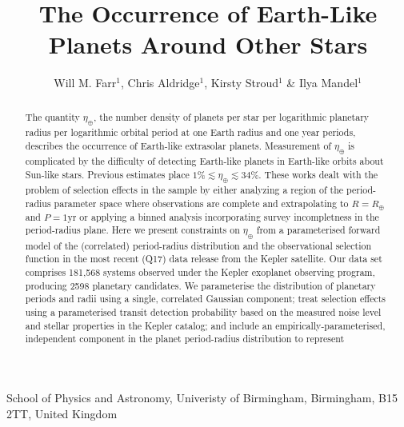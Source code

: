 \documentclass{nature}
\newcommand{\etaearth}{\eta_\oplus}
\newcommand{\REarth}{R_\oplus}
\begin{document}
\title{The Occurrence of Earth-Like Planets Around Other Stars}

\author{Will M. Farr$^{1}$, Chris Aldridge$^{1}$, Kirsty Stroud$^{1}$ \& Ilya Mandel$^{1}$}

\maketitle

\begin{affiliations}
\item School of Physics and Astronomy, Univeristy of Birmingham, Birmingham, B15 2TT, United Kingdom
\end{affiliations}

\begin{abstract}
  The quantity $\etaearth$, the number density of planets per star per
  logarithmic planetary radius per logarithmic orbital period at one
  Earth radius and one year periods, describes the occurrence of
  Earth-like extrasolar planets.  Measurement of $\etaearth$ is
  complicated by the difficulty of detecting Earth-like planets in
  Earth-like orbits about Sun-like stars.  Previous
  estimates\cite{2011ApJ...738..151C,2012ApJ...745...20T,2013ApJ...778...53D,2013PNAS..11019273P}
  place $1\% \lesssim \etaearth \lesssim 34\%$.  These works dealt
  with the problem of selection effects in the sample by either
  analyzing a region of the period-radius parameter space where
  observations are complete and extrapolating to $R = \REarth$ and $P
  = 1 \mathrm{yr}$\cite{2011ApJ...738..151C,2012ApJ...745...20T} or
  applying a binned analysis incorporating survey incompletness in the
  period-radius plane\cite{2013ApJ...778...53D,2013PNAS..11019273P}.
  Here we present constraints on $\etaearth$ from a parameterised
  forward model of the (correlated) period-radius distribution and the
  observational selection function in the most recent (Q17) data
  release from the Kepler
  satellite\cite{2010Sci...327..977B,2011ApJ...736...19B,2013ApJS..204...24B}.
  Our data set comprises 181,568 systems observed under the Kepler
  exoplanet observing program, producing 2598 planetary candidates.
  We parameterise the distribution of planetary periods and radii
  using a single, correlated Gaussian component; treat selection
  effects using a parameterised transit detection probability based on
  the measured noise level and stellar properties in the Kepler
  catalog; and include an empirically-parameterised, independent
  component in the planet period-radius distribution to represent

\end{abstract}
\end{document}
